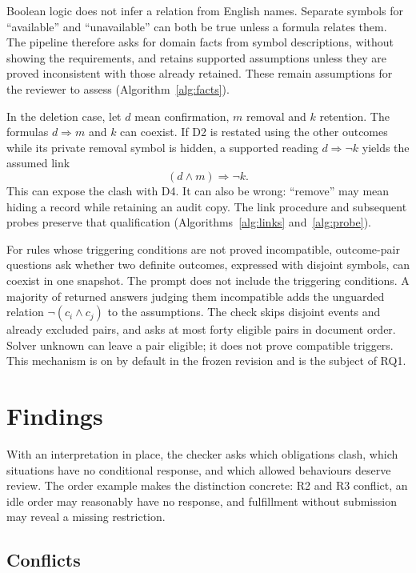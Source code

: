 Boolean logic does not infer a relation from English names. Separate symbols for ``available'' and ``unavailable'' can both be true unless a formula relates them. The pipeline therefore asks for domain facts from symbol descriptions, without showing the requirements, and retains supported assumptions unless they are proved inconsistent with those already retained. These remain assumptions for the reviewer to assess (Algorithm~\ref{alg:facts}).

In the deletion case, let $d$ mean confirmation, $m$ removal and $k$ retention. The formulas $d\Rightarrow m$ and $k$ can coexist. If D2 is restated using the other outcomes while its private removal symbol is hidden, a supported reading $d\Rightarrow\neg k$ yields the assumed link
\[
 (d\land m)\Rightarrow\neg k.
\]
This can expose the clash with D4. It can also be wrong: ``remove'' may mean hiding a record while retaining an audit copy. The link procedure and subsequent probes preserve that qualification (Algorithms~\ref{alg:links} and~\ref{alg:probe}).

For rules whose triggering conditions are not proved incompatible, outcome-pair questions ask whether two definite outcomes, expressed with disjoint symbols, can coexist in one snapshot. The prompt does not include the triggering conditions. A majority of returned answers judging them incompatible adds the unguarded relation $\neg(c_i\land c_j)$ to the assumptions. The check skips disjoint events and already excluded pairs, and asks at most forty eligible pairs in document order. Solver unknown can leave a pair eligible; it does not prove compatible triggers. This mechanism is on by default in the frozen revision and is the subject of RQ1.

\section{Findings}\label{sec:solver}

With an interpretation in place, the checker asks which obligations clash, which situations have no conditional response, and which allowed behaviours deserve review. The order example makes the distinction concrete: R2 and R3 conflict, an idle order may reasonably have no response, and fulfillment without submission may reveal a missing restriction.

\subsection{Conflicts}

